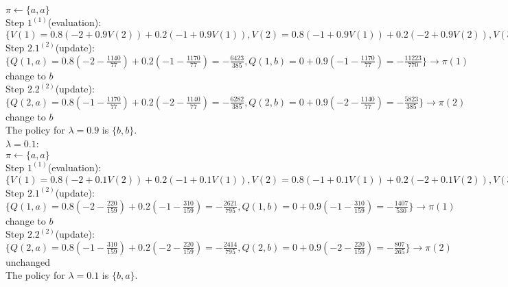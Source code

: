 \documentclass[11pt]{article}
\begin{document}
\begin{onehalfspace}
\begin{itemize}
$\pi \leftarrow \{a, a\}$\\
Step $1^{(1)}$(evaluation): $\{V(1) = 0.8(-2+0.9V(2)) + 0.2(-1+0.9V(1)), V(2) = 0.8(-1+0.9V(1))+0.2(-2+0.9V(2)), V(3) = 0\} \rightarrow \{V(1) = -\frac{1170}{77}, V(2) = -\frac{1140}{77}\}$\\
Step $2.1^{(2)}$(update): $\{Q(1, a) = 0.8(-2 - \frac{1140}{77}) + 0.2(-1 - \frac{1170}{77}) = -\frac{6423}{385}, Q(1,b) = 0 + 0.9(-1-\frac{1170}{77}) = -\frac{11223}{770}\} \rightarrow \pi(1)$ change to $b$\\
Step $2.2^{(2)}$(update): $\{Q(2, a) = 0.8(-1 - \frac{1170}{77}) + 0.2(-2 - \frac{1140}{77}) = -\frac{6282}{385}, Q(2, b) = 0 + 0.9(-2-\frac{1140}{77})=-\frac{5823}{385}\} \rightarrow \pi(2)$ change to $b$\\
The policy for $\lambda = 0.9$ is $\{b,b\}$.
\\
$\lambda = 0.1$:\\
$\pi \leftarrow \{a, a\}$\\
Step $1^{(1)}$(evaluation): $\{V(1) = 0.8(-2+0.1V(2)) + 0.2(-1+0.1V(1)), V(2) = 0.8(-1+0.1V(1))+0.2(-2+0.1V(2)), V(3) = 0\} \rightarrow \{V(1) = -\frac{310}{159}, V(2) = -\frac{220}{159}\}$\\
Step $2.1^{(2)}$(update): $\{Q(1, a) = 0.8(-2 - \frac{220}{159}) + 0.2(-1 - \frac{310}{159}) = -\frac{2621}{795}, Q(1,b) = 0 + 0.9(-1-\frac{310}{159}) = -\frac{1407}{530}\} \rightarrow \pi(1)$ change to $b$\\
Step $2.2^{(2)}$(update): $\{Q(2, a) = 0.8(-1 - \frac{310}{159}) + 0.2(-2 - \frac{220}{159}) = -\frac{2414}{795}, Q(2, b) = 0 + 0.9(-2-\frac{220}{159})=-\frac{807}{265}\} \rightarrow \pi(2)$ unchanged\\
The policy for $\lambda = 0.1$ is $\{b,a\}$.
\end{itemize}

\end{onehalfspace}
\end{document}
